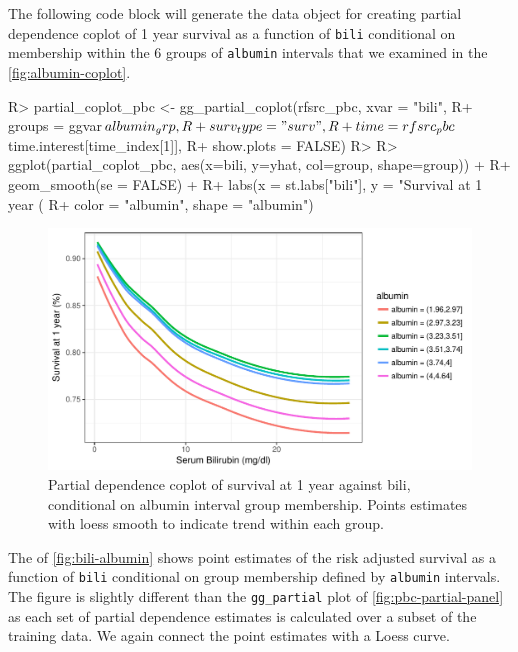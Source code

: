 \documentclass[article, nojss]{jss}
\begin{document}
The following code block will generate the data object for creating
partial dependence coplot of 1 year survival as a function of
\texttt{bili} conditional on membership within the 6 groups of
\texttt{albumin} intervals that we examined in the
\autoref{fig:albumin-coplot}.

\begin{Schunk}
\begin{Sinput}
R> partial_coplot_pbc <- gg_partial_coplot(rfsrc_pbc, xvar = "bili",
R+                                         groups = ggvar$albumin_grp,
R+                                         surv_type = "surv",
R+                                         time = rfsrc_pbc$time.interest[time_index[1]],
R+                                         show.plots = FALSE)
R>
R> ggplot(partial_coplot_pbc, aes(x=bili, y=yhat, col=group, shape=group)) +
R+   geom_smooth(se = FALSE) +
R+   labs(x = st.labs["bili"], y = "Survival at 1 year (%
R+        color = "albumin", shape = "albumin")
\end{Sinput}
\begin{figure}[!htb]

{\centering \includegraphics{rfs-bili-albumin-1}

}

\caption[Partial dependence coplot of survival at 1 year against bili, conditional on albumin interval group membership]{Partial dependence coplot of survival at 1 year against bili, conditional on albumin interval group membership. Points estimates with loess smooth to indicate trend within each group.}\label{fig:bili-albumin}
\end{figure}
\end{Schunk}

The  of \autoref{fig:bili-albumin} shows point
estimates of the risk adjusted survival as a function of \texttt{bili}
conditional on group membership defined by \texttt{albumin} intervals.
The figure is slightly different than the \texttt{gg\_partial} plot of
\autoref{fig:pbc-partial-panel} as each set of partial dependence
estimates is calculated over a subset of the training data. We again
connect the point estimates with a Loess curve.
\end{document}

